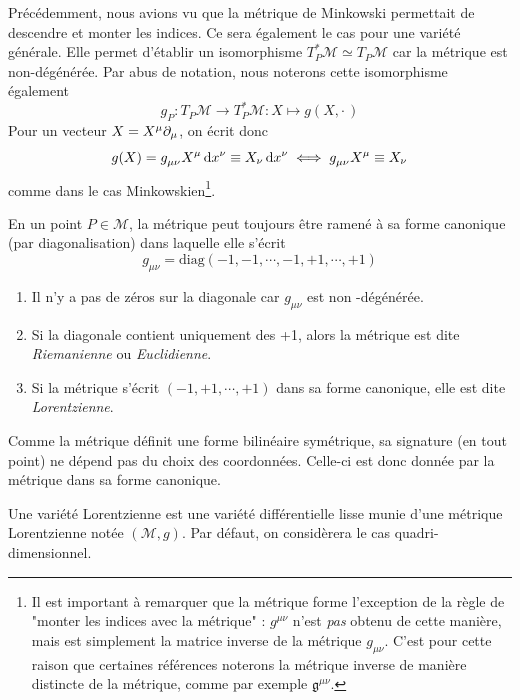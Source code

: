 Précédemment, nous avions vu que la métrique de Minkowski permettait de descendre et monter les indices. Ce sera également le cas pour une variété générale. Elle permet d'établir un isomorphisme $T^*_P \mathcal{M} \simeq T_P \mathcal{M}$ car la métrique est non-dégénérée. Par abus de notation, nous noterons cette isomorphisme également
\begin{equation}
    g_P:T_P \mathcal{M} \rightarrow T^*_P \mathcal{M}: X \mapsto g(X,\cdot\,)
\end{equation}
Pour un vecteur $X = X^\mu \partial_\mu$, on écrit donc
\begin{equation}
     g(X) = g\indices{_\mu_\nu} X^\mu \, \td x^\nu \equiv X_\nu\, \td x^\nu \iff g\indices{_\mu_\nu} X^\mu \equiv X_\nu
\end{equation}
comme dans le cas Minkowskien\footnote{Il est important à remarquer que la métrique forme l'exception de la règle de "monter les indices avec la métrique" : $g^{\mu\nu}$ n'est \emph{pas} obtenu de cette manière, mais est simplement la matrice inverse de la métrique $g_{\mu\nu}$. C'est pour cette raison que certaines références noterons la métrique inverse de manière distincte de la métrique, comme par exemple $\mathfrak{g}^{\mu\nu}$.}.

\begin{rmk}
    En un point $P \in \mathcal{M}$, la métrique peut toujours être ramené à sa forme canonique (par diagonalisation) dans laquelle elle s'écrit 
    \begin{equation}
        g_{\mu \nu} = \mathrm{diag}(-1, -1, \cdots, -1, +1, \cdots, +1)
    \end{equation}

    \begin{enumerate}
        \item Il n'y a pas de zéros sur la diagonale car $g_{\mu \nu}$ est non -dégénérée. 
        \item Si la diagonale contient uniquement des +1, alors la métrique est dite \textit{Riemanienne} ou \textit{Euclidienne}.
        \item  Si la métrique s'écrit $(-1, +1, \cdots, +1)$ dans sa forme canonique, elle est dite \textit{Lorentzienne}.
    \end{enumerate}
Comme la métrique définit une forme bilinéaire symétrique, sa signature (en tout point) ne dépend pas du choix des coordonnées. Celle-ci est donc donnée par la métrique dans sa forme canonique.
\begin{theoremframe}
    \begin{defi}
        Une variété Lorentzienne est une variété différentielle lisse munie d'une métrique Lorentzienne notée $(\mathcal{M},g)$. Par défaut, on considèrera le cas quadri-dimensionnel.
    \end{defi}
\end{theoremframe}
\end{rmk}

